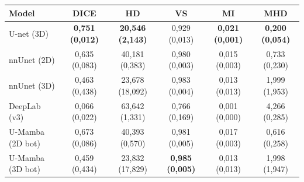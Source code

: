\begin{tabular}{l c c c c c}
 \hline
Model & DICE & HD & VS & MI & MHD \\ \hline
U-net (3D) & \textbf{0,751 (0,012)} & \textbf{20,546 (2,143)} & 0,929 (0,013) & \textbf{0,021 (0,001)} & \textbf{0,200 (0,054)} \\ 
nnUnet (2D) & 0,635 (0,083) & 40,181 (0,383) & 0,980 (0,003) & 0,015 (0,003) & 0,733 (0,230) \\ 
nnUnet (3D) & 0,463 (0,438) & 23,678 (18,092) & 0,983 (0,004) & 0,013 (0,013) & 1,999 (1,953) \\ 
DeepLab (v3) & 0,066 (0,022) & 63,642 (1,331) & 0,766 (0,169) & 0,001 (0,000) & 4,266 (0,285) \\ 
U-Mamba (2D bot) & 0,673 (0,086) & 40,393 (0,570) & 0,981 (0,005) & 0,017 (0,003) & 0,616 (0,258) \\ 
U-Mamba (3D bot) & 0,459 (0,434) & 23,832 (17,829) & \textbf{0,985 (0,005)} & 0,013 (0,013) & 1,998 (1,947) \\ 
\hline 
 \end{tabular}
